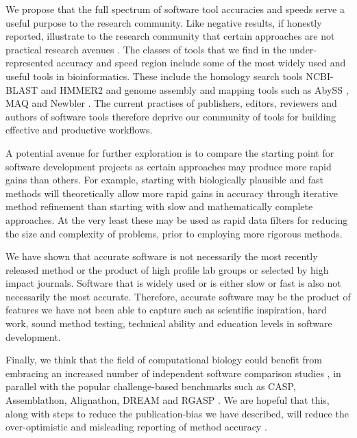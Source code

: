 \documentclass[fleqn,10pt]{SelfArx} %
\begin{document}
We propose that the full spectrum of software tool accuracies and
speeds serve a useful purpose to the research community. Like negative
results, if honestly reported, illustrate to the research community
that certain approaches are not practical research avenues
\cite{Ioannidis2005-xh,Workman1999-au,Rivas2000-fb}. The classes of
tools that we find in the under-represented accuracy and speed region
include some of the most widely used and useful tools in
bioinformatics. These include the homology search tools NCBI-BLAST
\cite{Altschul1990-ht,Altschul1997-ga} and HMMER2 \cite{Eddy:2009} and
genome assembly and mapping tools such as AbySS \cite{Simpson:2009},
MAQ \cite{Li:2008} and Newbler \cite{Margulies:2005}. The current
practises of publishers, editors, reviewers and authors of software
tools therefore deprive our community of tools for building effective
and productive workflows.

A potential avenue for further exploration is to compare the starting
point for software development projects as certain approaches may
produce more rapid gains than others. For example, starting with
biologically plausible and fast methods will theoretically allow more
rapid gains in accuracy through iterative method refinement than
starting with slow and mathematically complete approaches. At the very
least these may be used as rapid data filters for reducing the size
and complexity of problems, prior to employing more rigorous methods.


We have shown that accurate software is not necessarily the most
recently released method or the product of high profile lab groups or
selected by high impact journals. Software that is widely used or is
either slow or fast is also not necessarily the most
accurate. Therefore, accurate software may be the product of features
we have not been able to capture such as scientific inspiration, hard work,
sound method testing, technical ability and
education levels in software development. %


Finally, we think that the field of computational biology could
benefit from embracing an increased number of independent software
comparison studies \cite{Boulesteix2013-vb}, in parallel with the
popular challenge-based benchmarks such as CASP, Assemblathon,
Alignathon, DREAM and RGASP \cite{Boutros2014-zm}. We are hopeful that
this, along with steps to reduce the publication-bias we have
described, will reduce the over-optimistic and misleading reporting of
method accuracy
\cite{Boulesteix2010-te,Jelizarow2010-zf,Norel2011-cq}.
\end{document}
